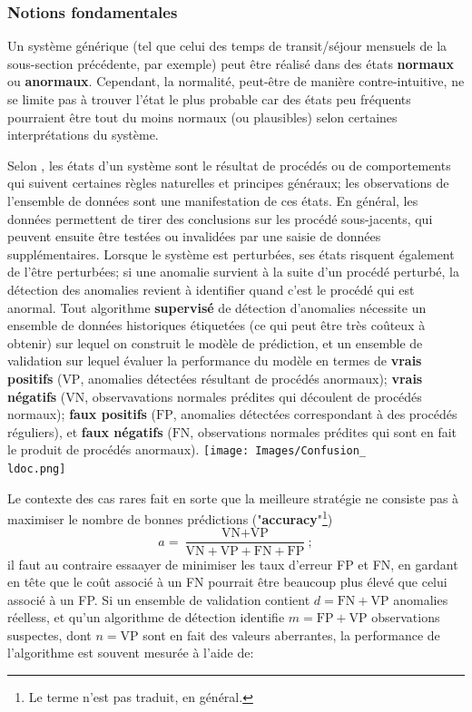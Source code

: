 \subsubsection*{Notions fondamentales}
Un système générique (tel que celui des temps de transit/s\'ejour mensuels de la sous-section précédente, par exemple) peut être réalisé dans des états \textbf{normaux} ou \textbf{anormaux}. Cependant, la normalité, peut-être de mani\`ere contre-intuitive, ne se limite pas à trouver l'état le plus probable car des états peu fréquents pourraient être tout du moins normaux (ou plausibles) selon certaines interprétations du système. \par Selon \cite{A10}, les états d'un système sont le résultat de proc\'ed\'es ou de comportements qui suivent certaines règles naturelles et principes généraux; les ob\-ser\-va\-tions de l'ensemble de donn\'ees sont une manifestation de ces états. En général, les données permettent de tirer des conclusions sur les proc\'ed\'e sous-jacents, qui peuvent ensuite être testées ou invalidées par une saisie de données supplémentaires. Lorsque le syst\`eme est perturbées, ses \'etats risquent également de l'être perturbées; si une anomalie survient à la suite d'un proc\'ed\'e perturbé, la d\'etection des anomalies revient \`a identifier quand c'est le proc\'ed\'e qui est anormal. 
\newl Tout algorithme \textbf{supervisé} de détection d'anomalies n\'ecessite un ensemble de données historiques étiquetées (ce qui peut être tr\`es coûteux à obtenir) sur lequel on construit le modèle de prédiction, et un ensemble de validation sur lequel évaluer la performance du modèle en termes de \textbf{vrais positifs} ($\text{VP}$, anomalies d\'etect\'ees résultant  de procédés anormaux); \textbf{vrais n\'egatifs} ($\text{VN}$, ob\-ser\-va\-va\-tions normales prédites qui découlent  de procédés normaux); \textbf{faux positifs} ($\text{FP}$, anomalies détectées correspondant à des proc\'ed\'es réguliers), et \textbf{faux négatifs} ($\text{FN}$, ob\-ser\-va\-tions normales prédites qui sont en fait le produit de proc\'ed\'es anormaux). \newpage\noindent
\qquad\texttt{[image: Images/Confusion\_\\ldoc.png]}\par\noindent
Le contexte des cas rares fait en sorte que la meilleure strat\'egie ne consiste pas \`a maximiser le nombre de bonnes pr\'edictions ("\textbf{accuracy}"\footnote{Le terme n'est pas traduit, en g\'en\'eral.}) $$a=\frac{\text{VN}+\text{VP}}{\text{VN}+\text{VP}+\text{FN}+\text{FP}};$$ il faut au contraire essaayer de minimiser les taux d'erreur FP et FN, en gardant en t\^ete que le co\^ut associ\'e \`a un FN pourrait \^etre beaucoup plus \'elev\'e que celui associ\'e \`a un FP. \newpage \noindent Si un ensemble de validation contient $d=\text{FN}+\text{VP}$ anomalies r\'eelless, et qu'un algorithme de détection identifie $m=\text{FP}+\text{VP}$ ob\-ser\-va\-tions suspectes, dont $n=\text{VP}$ sont en fait des valeurs aberrantes, la performance de l'algorithme est souvent mesurée à l'aide de: 
